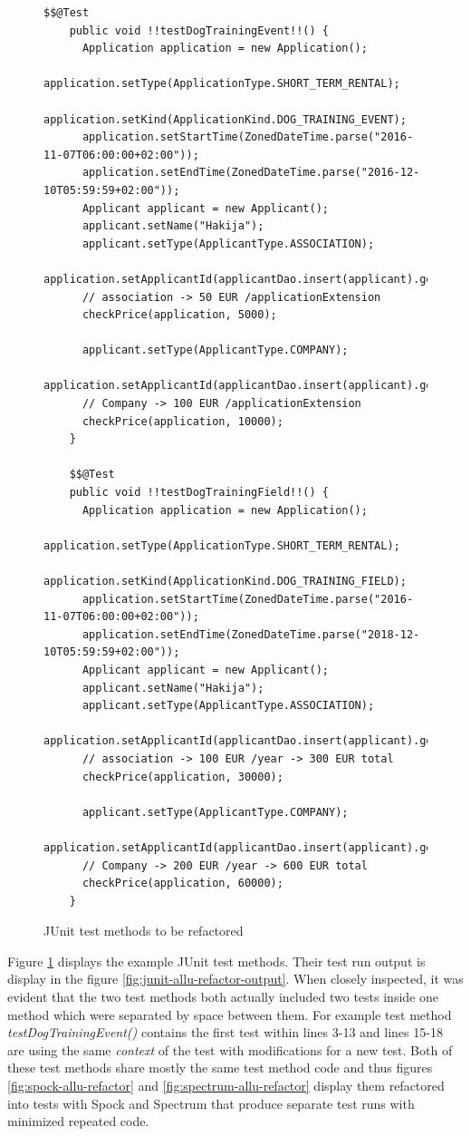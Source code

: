     \begin{figure}[H]
      \begin{lstlisting}[style=java]
    $$@Test
    public void !!testDogTrainingEvent!!() {
      Application application = new Application();
      application.setType(ApplicationType.SHORT_TERM_RENTAL);
      application.setKind(ApplicationKind.DOG_TRAINING_EVENT);
      application.setStartTime(ZonedDateTime.parse("2016-11-07T06:00:00+02:00"));
      application.setEndTime(ZonedDateTime.parse("2016-12-10T05:59:59+02:00"));
      Applicant applicant = new Applicant();
      applicant.setName("Hakija");
      applicant.setType(ApplicantType.ASSOCIATION);
      application.setApplicantId(applicantDao.insert(applicant).getId());
      // association -> 50 EUR /applicationExtension
      checkPrice(application, 5000);

      applicant.setType(ApplicantType.COMPANY);
      application.setApplicantId(applicantDao.insert(applicant).getId());
      // Company -> 100 EUR /applicationExtension
      checkPrice(application, 10000);
    }

    $$@Test
    public void !!testDogTrainingField!!() {
      Application application = new Application();
      application.setType(ApplicationType.SHORT_TERM_RENTAL);
      application.setKind(ApplicationKind.DOG_TRAINING_FIELD);
      application.setStartTime(ZonedDateTime.parse("2016-11-07T06:00:00+02:00"));
      application.setEndTime(ZonedDateTime.parse("2018-12-10T05:59:59+02:00"));
      Applicant applicant = new Applicant();
      applicant.setName("Hakija");
      applicant.setType(ApplicantType.ASSOCIATION);
      application.setApplicantId(applicantDao.insert(applicant).getId());
      // association -> 100 EUR /year -> 300 EUR total
      checkPrice(application, 30000);

      applicant.setType(ApplicantType.COMPANY);
      application.setApplicantId(applicantDao.insert(applicant).getId());
      // Company -> 200 EUR /year -> 600 EUR total
      checkPrice(application, 60000);
    }
        \end{lstlisting}
        \caption{JUnit test methods to be refactored}
        \label{fig:junit-allu-refactor}

    \end{figure}

    Figure \ref{fig:junit-allu-refactor} displays the example JUnit test methods. Their test run output is display in the
    figure \ref{fig:junit-allu-refactor-output}. When closely inspected, it was evident
    that the two test methods both actually included two tests inside one method which were separated by space between
    them. For example test method \textit{testDogTrainingEvent()} contains the first test within lines 3-13 and lines 15-18 are using
    the same \textit{context} of the test with modifications for a new test.
    Both of these test methods share mostly the same test method code and thus figures \ref{fig:spock-allu-refactor} and
    \ref{fig:spectrum-allu-refactor} display them refactored
    into tests with Spock and Spectrum that produce separate test runs with minimized repeated code.

